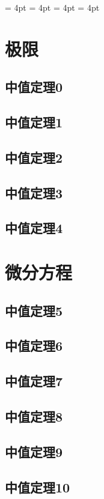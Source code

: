 \documentclass[no-math]{lecture}
\begin{document}
	\raggedbottom
	\abovedisplayshortskip = 4pt
	\belowdisplayshortskip = 4pt
	\abovedisplayskip 		 = 4pt
	\belowdisplayskip 		 = 4pt
	\frontmatter
		\tableofcontents
	\mainmatter

	\chapter{极限}
		
		\section{中值定理0}
		\section{中值定理1}
		\section{中值定理2}
		\section{中值定理3}
		\section{中值定理4}
	\chapter{微分方程}
		\section{中值定理5}
		\section{中值定理6}
		\section{中值定理7}
		\section{中值定理8}
		\section{中值定理9}
		\section{中值定理10}
\end{document}
